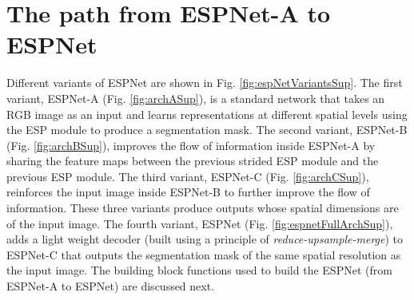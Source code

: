 \documentclass[runningheads]{llncs}
\def\Fig{Fig. }
\begin{document}
\section{The path from ESPNet-A to ESPNet}
\label{sec:detailsBlocks}
Different variants of ESPNet are shown in \Fig \ref{fig:espNetVariantsSup}. The first variant, ESPNet-A (\Fig \ref{fig:archASup}), is a standard network that takes an RGB image as an input and learns representations at different spatial levels using the ESP module to produce a segmentation mask. The second variant, ESPNet-B (\Fig \ref{fig:archBSup}), improves the flow of information inside ESPNet-A by sharing the feature maps between the previous strided ESP module and the previous ESP module. The third variant, ESPNet-C (\Fig \ref{fig:archCSup}), reinforces the input image inside ESPNet-B to further improve the flow of information. These three variants produce outputs whose spatial dimensions are  of the input image. The fourth variant, ESPNet (\Fig \ref{fig:espnetFullArchSup}), adds a light weight decoder (built using a principle of \textit{reduce-upsample-merge}) to ESPNet-C that outputs the segmentation mask of the same spatial resolution as the input image. The building block functions used to build the ESPNet (from ESPNet-A to ESPNet) are discussed next.
\end{document}
